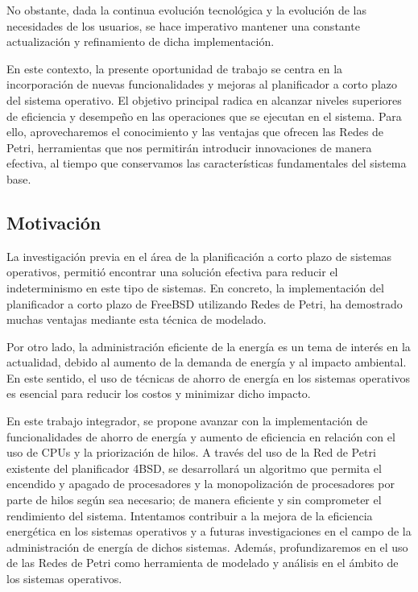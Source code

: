 No obstante, dada la continua evolución tecnológica y la evolución de las necesidades de los usuarios, se hace imperativo mantener una constante actualización y refinamiento de dicha implementación.\par

En este contexto, la presente oportunidad de trabajo se centra en la incorporación de nuevas funcionalidades y mejoras al planificador a corto plazo del sistema operativo. El objetivo principal radica en alcanzar niveles superiores de eficiencia y desempeño en las operaciones que se ejecutan en el sistema. Para ello, aprovecharemos el conocimiento y las ventajas que ofrecen las Redes de Petri, herramientas que nos permitirán introducir innovaciones de manera efectiva, al tiempo que conservamos las características fundamentales del sistema base.\par


\subsection{Motivación}
La investigación previa en el área de la planificación a corto plazo de sistemas operativos, permitió encontrar una solución efectiva para reducir el indeterminismo en este tipo de sistemas. En concreto, la implementación del planificador a corto plazo de FreeBSD utilizando Redes de Petri, ha demostrado muchas ventajas mediante esta técnica de modelado.\par

Por otro lado, la administración eficiente de la energía es un tema de interés en la actualidad, debido al aumento de la demanda de energía y al impacto ambiental. En este sentido, el uso de técnicas de ahorro de energía en los sistemas operativos es esencial para reducir los costos y minimizar dicho impacto.\par

En este trabajo integrador, se propone avanzar con la implementación de funcionalidades de ahorro de energía y aumento de eficiencia en relación con el uso de CPUs y la priorización de hilos. A través del uso de la Red de Petri existente del planificador 4BSD, se desarrollará un algoritmo que permita el encendido y apagado de procesadores y la monopolización de procesadores por parte de hilos según sea necesario; de manera eficiente y sin comprometer el rendimiento del sistema. Intentamos contribuir a la mejora de la eficiencia energética en los sistemas operativos y a futuras investigaciones en el campo de la administración de energía de dichos sistemas. Además, profundizaremos en el uso de las Redes de Petri como herramienta de modelado y análisis en el ámbito de los sistemas operativos.\par

